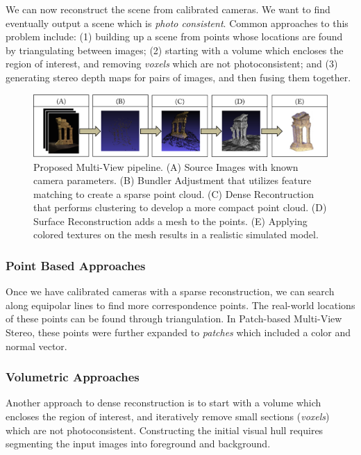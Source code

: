 \documentclass[10pt,twocolumn,letterpaper]{article}
\begin{document}
We can now reconstruct the scene from calibrated cameras. We want to find eventually output a scene which is \emph{photo consistent}. Common approaches to this problem include: (1) building up a scene from points whose locations are found by triangulating between images; (2) starting with a volume which encloses the region of interest, and removing \emph{voxels} which are not photoconsistent; and (3) generating stereo depth maps for pairs of images, and then fusing them together.\cite{furukawa}

\begin{figure}[t]
  \begin{center}
    \includegraphics[width=\linewidth]{pipeline3.png}
  \end{center}
  \caption{Proposed Multi-View pipeline. (A) Source Images with known camera parameters. (B) Bundler Adjustment that utilizes feature matching to create a sparse point cloud. (C) Dense Recontruction that performs clustering to develop a more compact point cloud. (D) Surface Reconstruction adds a mesh to the points. (E) Applying colored textures on the mesh results in a realistic simulated model.}   
  \label{fig:short}
\end{figure}

\subsubsection{Point Based Approaches}

Once we have calibrated cameras with a sparse reconstruction, we can search along equipolar lines to find more correspondence points. The real-world locations of these points can be found through triangulation. In Patch-based Multi-View Stereo, these points were further expanded to \emph{patches} which included a color and normal vector.\cite{furukawa}

\subsubsection{Volumetric Approaches}

Another approach to dense reconstruction is to start with a volume which encloses the region of interest, and iteratively remove small sections (\emph{voxels}) which are not photoconsistent. Constructing the initial visual hull requires segmenting the input images into foreground and background.\cite{spacecarving}
\end{document}
